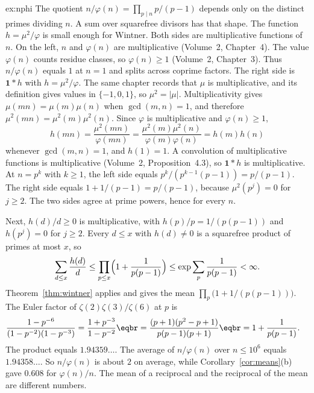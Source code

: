 \begin{solution}{ex:nphi}
\idea The quotient $n/\varphi(n)=\prod_{p\mid n}p/(p-1)$ depends only on the distinct primes dividing $n$. A sum over squarefree divisors has that shape. The function $h=\mu^2/\varphi$ is small enough for Wintner.
\writeup Both sides are multiplicative functions of $n$. On the left, $n$ and $\varphi(n)$ are multiplicative (Volume~2, Chapter~4). The value $\varphi(n)$ counts residue classes, so $\varphi(n)\ge1$ (Volume~2, Chapter~3). Thus $n/\varphi(n)$ equals $1$ at $n=1$ and splits across coprime factors. The right side is $\mathbf1*h$ with $h=\mu^2/\varphi$. The same chapter records that $\mu$ is multiplicative, and its definition gives values in $\{-1,0,1\}$, so $\mu^2=|\mu|$. Multiplicativity gives $\mu(mn)=\mu(m)\mu(n)$ when $\gcd(m,n)=1$, and therefore $\mu^2(mn)=\mu^2(m)\mu^2(n)$. Since $\varphi$ is multiplicative and $\varphi(n)\ge1$,
\[
h(mn)=\frac{\mu^2(mn)}{\varphi(mn)}=\frac{\mu^2(m)\mu^2(n)}{\varphi(m)\varphi(n)}=h(m)h(n)
\]
whenever $\gcd(m,n)=1$, and $h(1)=1$. A convolution of multiplicative functions is multiplicative (Volume~2, Proposition~4.3), so $\mathbf1*h$ is multiplicative. At $n=p^k$ with $k\ge1$, the left side equals $p^k/(p^{k-1}(p-1))=p/(p-1)$. The right side equals $1+1/(p-1)=p/(p-1)$, because $\mu^2(p^j)=0$ for $j\ge2$. The two sides agree at prime powers, hence for every $n$.

Next, $h(d)/d\ge0$ is multiplicative, with $h(p)/p=1/(p(p-1))$ and $h(p^j)=0$ for $j\ge2$. Every $d\le x$ with $h(d)\ne0$ is a squarefree product of primes at most $x$, so
\[
\sum_{d\le x}\frac{h(d)}d\le\prod_{p\le x}\Bigl(1+\frac1{p(p-1)}\Bigr)\le\exp\sum_p\frac1{p(p-1)}<\infty.
\]
Theorem~\ref{thm:wintner} applies and gives the mean $\prod_p\bigl(1+1/(p(p-1))\bigr)$. The Euler factor of $\zeta(2)\zeta(3)/\zeta(6)$ at $p$ is
\[
\begin{aligned}\frac{1-p^{-6}}{(1-p^{-2})(1-p^{-3})}&=\frac{1+p^{-3}}{1-p^{-2}}\eqbr=\frac{(p+1)(p^2-p+1)}{p(p-1)(p+1)}\eqbr=1+\frac1{p(p-1)}.\end{aligned}
\]
The product equals $1.94359\ldots$. The average of $n/\varphi(n)$ over $n\le10^6$ equals $1.94358\ldots$. So $n/\varphi(n)$ is about $2$ on average, while Corollary~\ref{cor:means}(b) gave $0.608$ for $\varphi(n)/n$. The mean of a reciprocal and the reciprocal of the mean are different numbers.
\end{solution}

